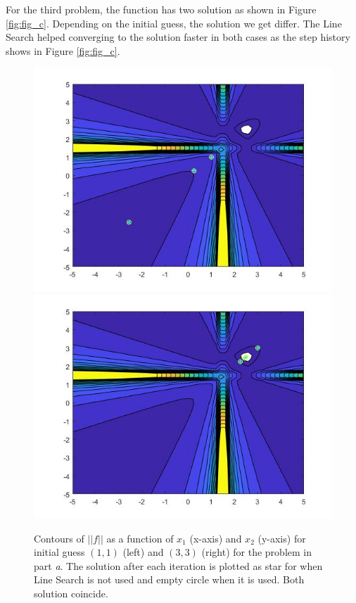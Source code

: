 For the third problem, the function has two solution as shown in Figure \ref{fig:fig_c}. Depending on the initial guess, the solution we get differ. The Line Search helped converging to the solution faster in both cases as the step history shows in Figure \ref{fig:fig_c}. 


\begin{figure}[wtbh]
 \centering  
   {\includegraphics[width=0.49\linewidth]{fun1_a1.jpg}}   
   {\includegraphics[width=0.49\linewidth]{fun1_a2.jpg}}
  \caption{Contours of $||f||$ as a function of $x_{1}$ (x-axis) and $x_{2}$ (y-axis) for initial guess $(1,1)$ (left) and $(3,3)$ (right) for the problem in part \emph{a}. The solution after each iteration is plotted as star for when Line Search is not used and empty circle when it is used. Both solution coincide.}
   \label{fig:fig_a}
\end{figure} 


